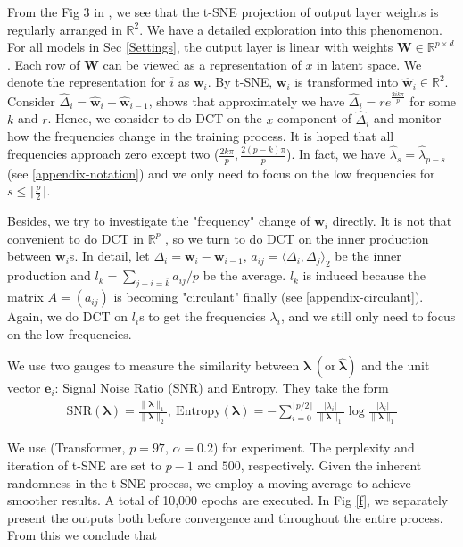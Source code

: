 \documentclass{article}
\begin{document}
From the Fig 3 in \cite{power2022grokking}, we see that the t-SNE projection of output layer weights is regularly arranged in $\mathbb{R}^2$. We have a detailed exploration into this phenomenon. For all models in Sec \ref{Settings}, the output layer is linear with weights $\bm{W} \in \mathbb{R}^{p\times d}$. Each row of $\bm{W}$ can be viewed as a representation of $\overline{x}$ in latent space. We denote the representation for $\overline{i}$ as $\bm{w}_i$. By t-SNE, $\bm{w}_i$ is transformed into $\widehat{\bm{w}}_i \in \mathbb{R}^2$. Consider $\widehat\Delta_i = \widehat{\bm{w}}_i - \widehat{\bm{w}}_{i-1}$, \cite{power2022grokking} shows that approximately we have $\widehat\Delta_i = re^{\frac{2ik\pi}{p}}$ for some $k$ and $r$. Hence, we consider to do DCT on the $x$ component of $\widehat\Delta_i$ and monitor how the frequencies change in the training process. It is hoped that all frequencies approach zero except two ($\frac{2k\pi}{p}, \frac{2(p-k)\pi}{p}$). In fact, we have $\widehat\lambda_s = \widehat\lambda_{p-s}$ (see \ref{appendix-notation}) and we only need to focus on the low frequencies for $s \leqslant \lceil\frac{p}2\rceil$.

Besides, we try to investigate the "frequency" change of $\bm{w}_i$ directly. It is not that convenient to do DCT in $\mathbb{R}^p$ , so we turn to do DCT on the inner production between $\bm{w}_i$s. In detail, let $\Delta_i = \bm{w}_i - \bm{w}_{i-1}$, $a_{ij} = \langle\Delta_i, \Delta_j\rangle_2$ be the inner production and $l_k = \sum_{\overline{j}-\overline{i}=\overline{k}}a_{ij} /p$ be the average. $l_k$ is induced because the matrix $A = (a_{ij})$ is becoming "circulant" finally (see \ref{appendix-circulant}). Again, we do DCT on $l_i$s to get the frequencies $\lambda_i$, and we still only need to focus on the low frequencies.

We use two gauges to measure the similarity between $\bm\lambda\ (\text{or}\ \bm{\widehat\lambda})$ and the unit vector $\bm e_i$: Signal Noise Ratio (SNR) and Entropy. They take the form
\begin{align}
    \text{SNR}(\bm\lambda) = \frac{\lVert \bm\lambda\rVert_1}{\lVert \bm\lambda\rVert_2},\ \text{Entropy}(\bm\lambda) = -\sum_{i=0}^{\lceil p/2\rceil} \frac{\lvert\lambda_i\rvert}{\rVert\bm\lambda\rVert_1} \log \frac{\lvert\lambda_i\rvert}{\rVert\bm\lambda\rVert_1}
\end{align}

We use (Transformer, $p = 97$, $\alpha=0.2$) for experiment. The perplexity and iteration of t-SNE are set to $p-1$ and $500$, respectively. Given the inherent randomness in the t-SNE process, we employ a moving average to achieve smoother results. A total of 10,000 epochs are executed. In Fig \ref{f}, we separately present the outputs both before convergence and throughout the entire process. From this we conclude that
\end{document}
